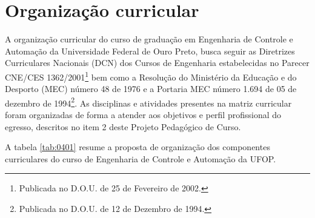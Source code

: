 \chapter{Organização curricular} 
\label{cap:04} 
%
A organização curricular do curso de graduação em Engenharia de Controle e Automação da Universidade Federal de Ouro Preto, busca seguir as Diretrizes Curriculares Nacionais (DCN) dos Cursos de Engenharia estabelecidas no Parecer CNE/CES 1362/2001\footnote{Publicada no D.O.U. de 25 de Fevereiro de 2002.} bem como a Resolução do Ministério da Educação e do Desporto (MEC) número 48 de 1976 e a Portaria MEC número 1.694 de 05 de dezembro de 1994\footnote{Publicada no D.O.U. de 12 de Dezembro de 1994.}. As disciplinas e atividades presentes na matriz curricular foram organizadas de forma a atender aos objetivos e perfil profissional do egresso, descritos no item 2 deste Projeto Pedagógico de Curso.

A tabela \ref{tab:0401} resume a proposta de organização dos componentes curriculares do curso de Engenharia de Controle e Automação da UFOP.

\begin{table}[htpb]
	\centering
	\caption{Organização de componentes curriculares.}
	\label{tab:0401}
\end{table}

